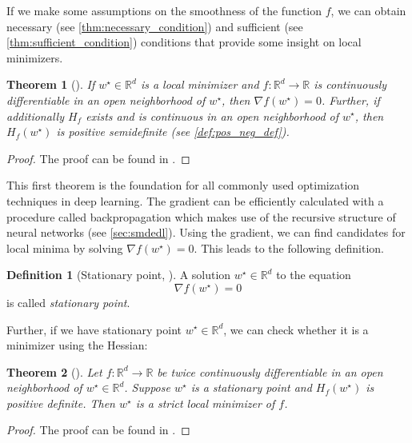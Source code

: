 \documentclass[12pt]{article}
\newtheorem{theorem}{Theorem}[section]
\theoremstyle{definition}
\newtheorem{definition}[definition]{Definition}
\numberwithin{equation}{section}
\newcommand{\R}{\mathbb{R}}
\begin{document}
If we make some assumptions on the smoothness of the function $f$, we can obtain necessary (see \autoref{thm:necessary_condition}) and sufficient (see \autoref{thm:sufficient_condition}) conditions that provide some insight on local minimizers.
\begin{theorem}[]
  \label{thm:necessary_condition}
  If $w^\star \in \R^d$ is a local minimizer and $f:\R^d \rightarrow \R$ is continuously differentiable in an open neighborhood of $w^\star$, then $\nabla f(w^\star) = 0$. Further, if additionally $H_f$ exists and is continuous in an open neighborhood of $w^\star$, then $H_f(w^\star)$ is positive semidefinite (see \autoref{def:pos_neg_def}).
\end{theorem}
\begin{proof}
  The proof can be found in \autocite{nocedalNumericalOptimization2006}.
\end{proof}
This first theorem is the foundation for all commonly used optimization techniques in deep learning. The gradient can be  efficiently calculated with a procedure called backpropagation which makes use of the recursive structure of neural networks (see \autoref{sec:smdedl}). 
Using the gradient, we can find candidates for local minima by solving $\nabla f(w^\star) = 0$. This leads to the following definition.
\begin{definition}[Stationary point, ]
  A solution $w^\star \in \R^d$ to the equation
  \begin{equation}
  \label{eq:StationaryPoint}
    \nabla f(w^\star) = 0
  \end{equation}
  is called \emph{stationary point}.
\end{definition}
Further, if we have stationary point $w^\star \in \R^d$, we can check whether it is a minimizer using the Hessian:
\begin{theorem}[]
  \label{thm:sufficient_condition}
  Let $f:\R^d \rightarrow \R$ be twice continuously differentiable in an open neighborhood of $w^\star \in \R^d$. Suppose $w^\star$ is a stationary point and $H_f(w^\star)$ is positive definite. Then $w^\star$ is a strict local minimizer of $f$.
\end{theorem}
\begin{proof}
  The proof can be found in \cite[pp.~16]{nocedalNumericalOptimization2006}.
\end{proof}
\end{document}

